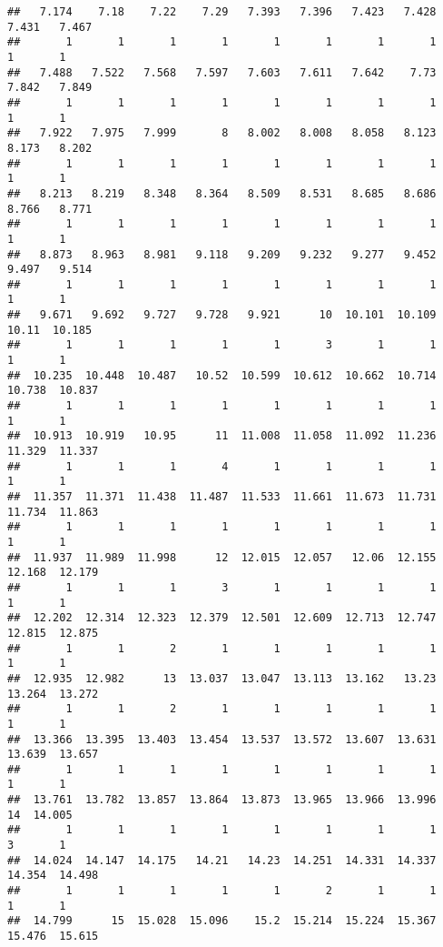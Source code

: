 \documentclass[]{article}
\begin{document}
\begin{verbatim}
##   7.174    7.18    7.22    7.29   7.393   7.396   7.423   7.428   7.431   7.467 
##       1       1       1       1       1       1       1       1       1       1 
##   7.488   7.522   7.568   7.597   7.603   7.611   7.642    7.73   7.842   7.849 
##       1       1       1       1       1       1       1       1       1       1 
##   7.922   7.975   7.999       8   8.002   8.008   8.058   8.123   8.173   8.202 
##       1       1       1       1       1       1       1       1       1       1 
##   8.213   8.219   8.348   8.364   8.509   8.531   8.685   8.686   8.766   8.771 
##       1       1       1       1       1       1       1       1       1       1 
##   8.873   8.963   8.981   9.118   9.209   9.232   9.277   9.452   9.497   9.514 
##       1       1       1       1       1       1       1       1       1       1 
##   9.671   9.692   9.727   9.728   9.921      10  10.101  10.109   10.11  10.185 
##       1       1       1       1       1       3       1       1       1       1 
##  10.235  10.448  10.487   10.52  10.599  10.612  10.662  10.714  10.738  10.837 
##       1       1       1       1       1       1       1       1       1       1 
##  10.913  10.919   10.95      11  11.008  11.058  11.092  11.236  11.329  11.337 
##       1       1       1       4       1       1       1       1       1       1 
##  11.357  11.371  11.438  11.487  11.533  11.661  11.673  11.731  11.734  11.863 
##       1       1       1       1       1       1       1       1       1       1 
##  11.937  11.989  11.998      12  12.015  12.057   12.06  12.155  12.168  12.179 
##       1       1       1       3       1       1       1       1       1       1 
##  12.202  12.314  12.323  12.379  12.501  12.609  12.713  12.747  12.815  12.875 
##       1       1       2       1       1       1       1       1       1       1 
##  12.935  12.982      13  13.037  13.047  13.113  13.162   13.23  13.264  13.272 
##       1       1       2       1       1       1       1       1       1       1 
##  13.366  13.395  13.403  13.454  13.537  13.572  13.607  13.631  13.639  13.657 
##       1       1       1       1       1       1       1       1       1       1 
##  13.761  13.782  13.857  13.864  13.873  13.965  13.966  13.996      14  14.005 
##       1       1       1       1       1       1       1       1       3       1 
##  14.024  14.147  14.175   14.21   14.23  14.251  14.331  14.337  14.354  14.498 
##       1       1       1       1       1       2       1       1       1       1 
##  14.799      15  15.028  15.096    15.2  15.214  15.224  15.367  15.476  15.615 

\end{verbatim}
\end{document}
